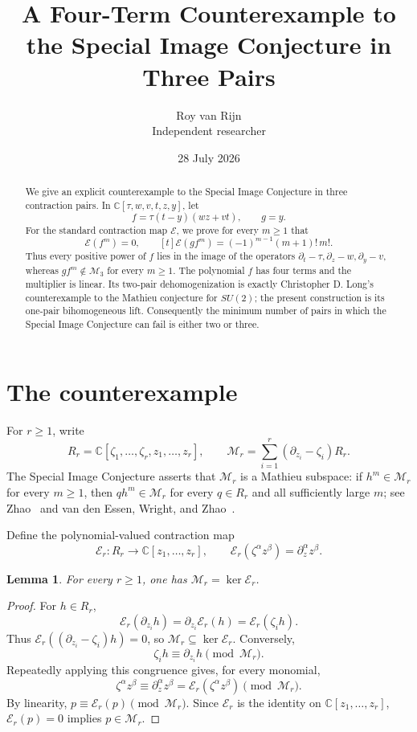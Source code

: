 \documentclass[11pt]{article}
\title{A Four-Term Counterexample to the Special Image Conjecture
  in Three Pairs}
\author{Roy van Rijn\\{\small Independent researcher}}
\date{28 July 2026}
\newtheorem{lemma}[theorem]{Lemma}
\newcommand{\C}{\mathbb C}
\newcommand{\Eop}{\mathcal E}
\newcommand{\M}{\mathcal M}
\begin{document}
\maketitle

\begin{abstract}
We give an explicit counterexample to the Special Image Conjecture in
three contraction pairs.  In
\(\C[\tau,w,v,t,z,y]\), let
\[
 f=\tau(t-y)(wz+vt),\qquad g=y.
\]
For the standard contraction map \(\Eop\), we prove for every \(m\geq1\)
that
\[
 \Eop(f^m)=0,\qquad
 [t]\Eop(gf^m)=(-1)^{m-1}(m+1)!\,m!.
\]
Thus every positive power of \(f\) lies in the image of the operators
\(\partial_t-\tau,\partial_z-w,\partial_y-v\), whereas
\(gf^m\notin\M_3\) for every \(m\geq1\).  The polynomial \(f\) has
four terms and the multiplier is linear.  Its two-pair dehomogenization is
exactly Christopher D. Long's counterexample to the Mathieu conjecture for
\(SU(2)\); the present construction is its one-pair bihomogeneous lift.
Consequently the minimum number of pairs in which the Special Image
Conjecture can fail is either two or three.
\end{abstract}

\section{The counterexample}

For \(r\geq1\), write
\[
 R_r=\C[\zeta_1,\ldots,\zeta_r,z_1,\ldots,z_r],
 \qquad
 \M_r=\sum_{i=1}^r(\partial_{z_i}-\zeta_i)R_r.
\]
The Special Image Conjecture asserts that \(\M_r\) is a Mathieu
subspace: if \(h^m\in\M_r\) for every \(m\geq1\), then
\(qh^m\in\M_r\) for every \(q\in R_r\) and all sufficiently large
\(m\); see Zhao~\cite{Zhao2010} and van den Essen, Wright, and
Zhao~\cite{EWZ2011}.

Define the polynomial-valued contraction map
\[
 \Eop_r:R_r\longrightarrow\C[z_1,\ldots,z_r],
 \qquad
 \Eop_r(\zeta^\alpha z^\beta)=\partial_z^\alpha z^\beta.
\]

\begin{lemma}\label{lem:kernel}
For every \(r\geq1\), one has \(\M_r=\ker\Eop_r\).
\end{lemma}

\begin{proof}
For \(h\in R_r\),
\[
 \Eop_r(\partial_{z_i}h)
 =\partial_{z_i}\Eop_r(h)
 =\Eop_r(\zeta_i h).
\]
Thus \(\Eop_r((\partial_{z_i}-\zeta_i)h)=0\), so
\(\M_r\subseteq\ker\Eop_r\).  Conversely,
\[
 \zeta_i h\equiv\partial_{z_i}h\pmod{\M_r}.
\]
Repeatedly applying this congruence gives, for every monomial,
\[
 \zeta^\alpha z^\beta
 \equiv\partial_z^\alpha z^\beta
 =\Eop_r(\zeta^\alpha z^\beta)
 \pmod{\M_r}.
\]
By linearity, \(p\equiv\Eop_r(p)\pmod{\M_r}\).  Since \(\Eop_r\) is
the identity on \(\C[z_1,\ldots,z_r]\), \(\Eop_r(p)=0\) implies
\(p\in\M_r\).
\end{proof}
\end{document}
